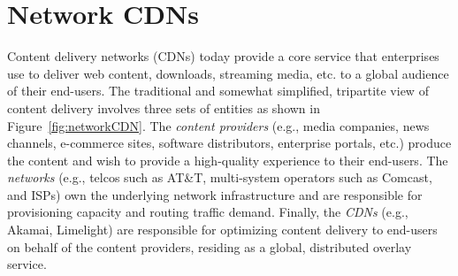 \chapter{Network CDNs}
\label{ch:ncdn}


Content delivery networks (CDNs) today provide a core service that enterprises use to deliver web content, downloads, streaming media, etc. to a global audience of their end-users. The traditional and somewhat simplified, tripartite view of content delivery involves three sets of entities as shown in Figure~\ref{fig:networkCDN}.  The {\em content providers}  (e.g., media companies, news channels, e-commerce sites, software distributors, enterprise portals, etc.) produce the content and wish to provide a high-quality experience to their end-users. The {\em networks} (e.g., telcos such as AT\&T, multi-system operators such as Comcast, and  ISPs) own  the underlying network infrastructure and are responsible for provisioning capacity and routing traffic demand. Finally, the {\em CDNs} (e.g., Akamai, Limelight) are responsible for optimizing content delivery to end-users on behalf of the content providers,  residing as a global, distributed overlay  service.

